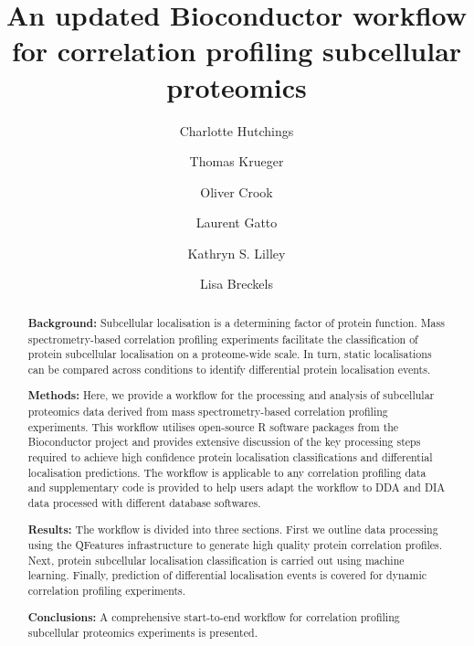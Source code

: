 \documentclass[9pt,a4paper,]{extarticle}
\begin{document}
\pagestyle{front}

\title{An updated Bioconductor workflow for correlation profiling subcellular proteomics}

\author[1]{Charlotte Hutchings}
\author[2]{Thomas Krueger}
\author[3]{Oliver Crook}
\author[4]{Laurent Gatto}
\author[1]{Kathryn S. Lilley}
\author[1]{Lisa Breckels}

\maketitle
\thispagestyle{front}

\begin{abstract}
\hfill\break
\textbf{Background:} Subcellular localisation is a determining factor of protein function.
Mass spectrometry-based correlation profiling experiments facilitate the classification
of protein subcellular localisation on a proteome-wide scale. In turn, static
localisations can be compared across conditions to identify differential protein
localisation events.

\textbf{Methods:} Here, we provide a workflow for the processing and analysis
of subcellular proteomics data derived from mass spectrometry-based correlation
profiling experiments. This workflow utilises open-source R software packages
from the Bioconductor project and provides extensive discussion of the key
processing steps required to achieve high confidence protein localisation
classifications and differential localisation predictions. The workflow is
applicable to any correlation profiling data and supplementary code is
provided to help users adapt the workflow to DDA and DIA data processed with
different database softwares.

\textbf{Results:} The workflow is divided into three sections. First we outline
data processing using the QFeatures infrastructure to generate high quality
protein correlation profiles. Next, protein subcellular localisation classification
is carried out using machine learning. Finally,
prediction of differential localisation events is covered for dynamic correlation
profiling experiments.

\textbf{Conclusions:} A comprehensive start-to-end workflow for correlation profiling
subcellular proteomics experiments is presented.
\end{abstract}
\end{document}
